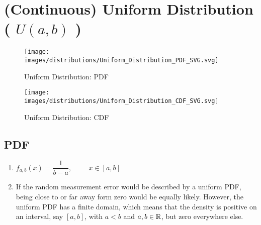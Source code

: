 \section{(Continuous) Uniform Distribution ( $U(a, b)$ )}

\begin{table}[H]
    \hfill
    \begin{minipage}{0.45\linewidth}
        \begin{figure}[H]
            \centering
            \texttt{[image: images/distributions/Uniform\_Distribution\_PDF\_SVG.svg]}
            \caption{Uniform Distribution: PDF \cite{wiki/Continuous_uniform_distribution}}
        \end{figure}
    \end{minipage}
    \hfill
    \begin{minipage}{0.45\linewidth}
        \begin{figure}[H]
            \centering
            \texttt{[image: images/distributions/Uniform\_Distribution\_CDF\_SVG.svg]}
            \caption{Uniform Distribution: CDF \cite{wiki/Continuous_uniform_distribution}}
        \end{figure}
    \end{minipage}
    \hfill
\end{table}

\subsection{PDF}

\begin{enumerate}
    \item[] $f_{a,b}(x) = \dfrac {1}{b-a}, \hspace{1cm} x \in [a, b]$
    \hfill \cite{statistics/book/Statistics-for-Data-Scientists/Maurits-Kaptein}

    \item If the random measurement error would be described by a uniform PDF, being close to or far away form zero would be equally likely. 
    However, the uniform PDF has a finite domain, which means that the density is positive on an interval, say $[a, b]$, with $a < b$ and $a, b \in \mathbb{R}$, but zero everywhere else.
    \hfill \cite{statistics/book/Statistics-for-Data-Scientists/Maurits-Kaptein}
\end{enumerate}



